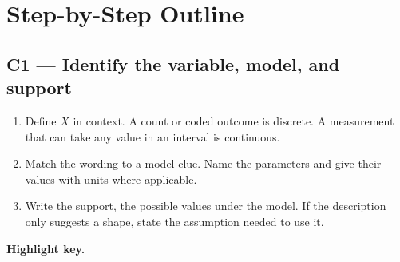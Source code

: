 \par\nobreak
\secInicio

\clearpage
\enlargethispage{12pt}
\section{Step-by-Step Outline}
\subsection{C1 --- Identify the variable, model, and support}\label{crit:c1}
\begin{enumerate}
  \item Define \(X\) in context. A count or coded outcome is discrete. A measurement that can take any value in an interval is continuous.
  \item Match the wording to a model clue. Name the parameters and give their values with units where applicable. 
  \item Write the support, the possible values under the model. If the description only suggests a shape, state the assumption needed to use it.
\end{enumerate}
{\small\noindent\textbf{Highlight key.}
 \enspace
{} \enspace
{}\\[3pt]
 \enspace
{}\par}


